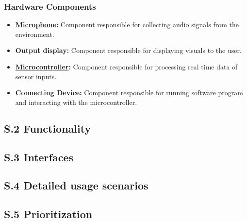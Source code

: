 \documentclass[12pt]{article}
\theoremstyle{definition}
\begin{document}
\subsubsection{Hardware Components}

\begin{itemize}
  \item \textbf{\href{def:microphone}{Microphone}:} Component responsible for
  collecting audio signals from the environment.

  \item \textbf{Output display:} Component responsible for displaying visuals to
  the user.

  \item \textbf{\href{def:microcontroller}{Microcontroller}:} Component
  responsible for processing real time data of sensor inputs.

  \item \textbf{Connecting Device:} Component responsible for running software
  program and interacting with the microcontroller.
\end{itemize}

\subsection{S.2 Functionality}

\subsection{S.3 Interfaces}

\subsection{S.4 Detailed usage scenarios}

\subsection{S.5 Prioritization}
\end{document}
